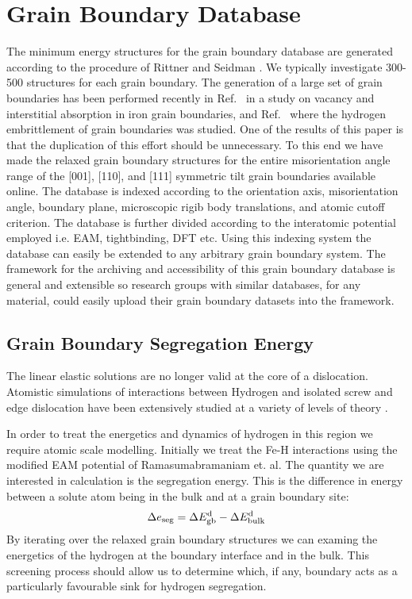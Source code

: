 \documentclass{article}
\begin{document}
\section{Grain Boundary Database}
The minimum energy structures for the grain boundary database are
generated according to the procedure of Rittner and Seidman \cite{rittner96}. We 
typically investigate 300-500 structures for each grain boundary.
The generation of a large set of grain boundaries has been performed recently in
Ref.~\cite{tschopp12} in a study on vacancy and interstitial absorption in iron grain
boundaries, and Ref.~\cite{wang13} where the hydrogen embrittlement of grain boundaries was
studied. One of the results of this paper is that the duplication of this effort should be unnecessary. 
To this end we have made the relaxed grain boundary structures for the entire misorientation angle
range of the [001], [110], and [111] symmetric tilt grain boundaries available online. The database
is indexed according to the orientation axis, misorientation angle, boundary plane,
microscopic rigib body translations, and atomic cutoff criterion. The database is further divided according 
to the interatomic potential employed i.e. EAM, tightbinding, DFT etc. 
Using this indexing system the database can easily be extended 
to any arbitrary grain boundary system. The framework for the archiving 
and accessibility of this grain boundary database is general and extensible so 
research groups with similar databases, for any material, could easily 
upload their grain boundary datasets into the framework.

\subsection{Grain Boundary Segregation Energy}
The linear elastic solutions are no longer valid at the core of a dislocation.
Atomistic simulations of interactions between Hydrogen and isolated screw and
edge dislocation have been extensively studied 
at a variety of levels of theory \cite{taketomi08, kimizuka11}.

In order to treat the energetics and dynamics of hydrogen in this region 
we require atomic scale modelling. Initially we treat the 
Fe-H interactions using the modified EAM potential of Ramasumabramaniam et. al.
The quantity we are interested in calculation is the segregation energy. 
This is the difference in energy between a solute atom 
being in the bulk and at a grain boundary site:
%
\begin{equation}
\Delta e_{{\rm seg}} = \Delta E^{\rm d}_{{\rm gb}} - \Delta E^{\rm d}_{{\rm bulk}}
\end{equation}
%
By iterating over the relaxed grain boundary structures we can examing the energetics
of the hydrogen at the boundary interface and in the bulk. This screening
process should allow us to determine which, if any, boundary acts as a particularly 
favourable sink for hydrogen segregation.
\end{document}
